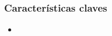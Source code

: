 \begin{frame}
    \frametitle{Caracter\'isticas claves}

    \begin{itemize}
        \item 
    \end{itemize}

\end{frame}